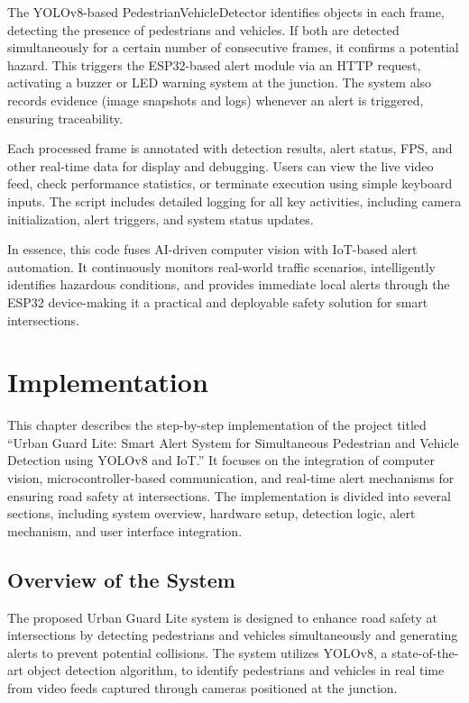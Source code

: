 \documentclass[a4paper, 12pt]{report}
\begin{document}
The YOLOv8-based PedestrianVehicleDetector identifies objects in each frame, detecting the presence of pedestrians and vehicles. If both are detected simultaneously for a certain number of consecutive frames, it confirms a potential hazard. This triggers the ESP32-based alert module via an HTTP request, activating a buzzer or LED warning system at the junction. The system also records evidence (image snapshots and logs) whenever an alert is triggered, ensuring traceability.

Each processed frame is annotated with detection results, alert status, FPS, and other real-time data for display and debugging. Users can view the live video feed, check performance statistics, or terminate execution using simple keyboard inputs. The script includes detailed logging for all key activities, including camera initialization, alert triggers, and system status updates.

In essence, this code fuses AI-driven computer vision with IoT-based alert automation. It continuously monitors real-world traffic scenarios, intelligently identifies hazardous conditions, and provides immediate local alerts through the ESP32 device-making it a practical and deployable safety solution for smart intersections.























\chapter{Implementation}

This chapter describes the step-by-step implementation of the project titled “Urban Guard Lite: Smart Alert System for Simultaneous Pedestrian and Vehicle Detection using YOLOv8 and IoT.” It focuses on the integration of computer vision, microcontroller-based communication, and real-time alert mechanisms for ensuring road safety at intersections. The implementation is divided into several sections, including system overview, hardware setup, detection logic, alert mechanism, and user interface integration.

\section{Overview of the System}
The proposed Urban Guard Lite system is designed to enhance road safety at intersections by detecting pedestrians and vehicles simultaneously and generating alerts to prevent potential collisions. The system utilizes YOLOv8, a state-of-the-art object detection algorithm, to identify pedestrians and vehicles in real time from video feeds captured through cameras positioned at the junction.
\end{document}
